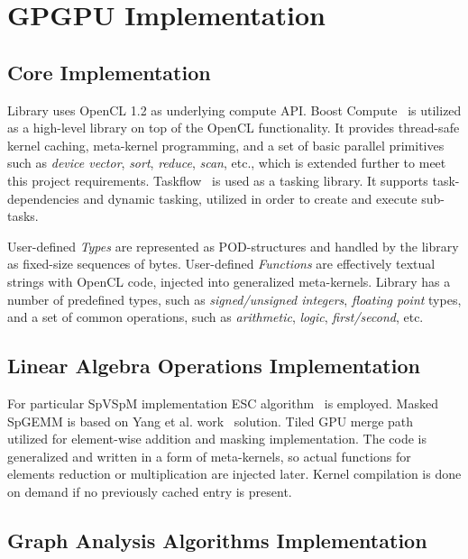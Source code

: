 \section{GPGPU Implementation}

\subsection{Core Implementation}
Library uses OpenCL 1.2 as underlying compute API. 
Boost Compute~\cite{10.1145/2909437.2909454:boost:compute} is utilized as a high-level library on top of the OpenCL functionality. 
It provides thread-safe kernel caching, meta-kernel programming, and a set of basic parallel primitives such as \textit{device vector}, \textit{sort}, \textit{reduce}, \textit{scan}, etc., which is extended further to meet this project requirements.
Taskflow~\cite{Huang2022TaskflowAL} is used as a tasking library. It supports task-dependencies and dynamic tasking, utilized in order to create and execute sub-tasks. 

User-defined \textit{Types} are represented as POD-structures and handled by the library as fixed-size sequences of bytes.
User-defined \textit{Functions} are effectively textual strings with OpenCL code, injected into generalized meta-kernels.
Library has a number of predefined types, such as \textit{signed/unsigned integers}, \textit{floating point} types, and a set of common operations, such as \textit{arithmetic}, \textit{logic}, \textit{first/second}, etc.


\subsection{Linear Algebra Operations Implementation}
For particular SpVSpM implementation ESC algorithm~\cite{10.1145/2699470:esc:algo} is employed. 
Masked SpGEMM is based on Yang et al. work~\cite{yang2019graphblast} solution. 
Tiled GPU merge path~\cite{inproceedings:gpu_merge_path} utilized for element-wise addition and masking implementation.
The code is generalized and written in a form of meta-kernels, so actual functions for elements reduction or multiplication are injected later.
Kernel compilation is done on demand if no previously cached entry is present.

\subsection{Graph Analysis Algorithms Implementation}